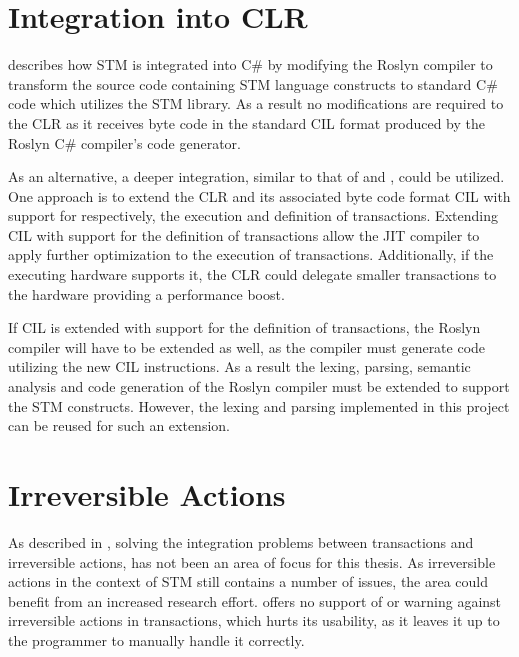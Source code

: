 \section{Integration into \acs{CLR}}\label{sec:fut_inte_clr}
 describes how \ac{STM} is integrated into C\# by modifying the Roslyn compiler to transform the source code containing \ac{STM} language constructs to standard C\# code which utilizes the \ac{STM} library. As a result no modifications are required to the \ac{CLR} as it receives byte code in the standard \ac{CIL} format produced by the Roslyn C\# compiler's code generator.

As an alternative, a deeper integration, similar to that of \cite{harris2003language} and \cite{duffy2010stmnet}, could be utilized. One approach is to extend the \ac{CLR} and its associated byte code format \ac{CIL} with support for respectively, the execution and definition of transactions. Extending \ac{CIL} with support for the definition of transactions allow the \ac{JIT} compiler to apply further optimization to the execution of transactions. Additionally, if the executing hardware supports it, the \ac{CLR} could delegate smaller transactions to the hardware providing a performance boost.

If \ac{CIL} is extended with support for the definition of transactions, the Roslyn compiler will have to be extended as well, as the compiler must generate code utilizing the new \ac{CIL} instructions. As a result the lexing, parsing, semantic analysis and code generation of the Roslyn compiler must be extended to support the \ac{STM} constructs. However, the lexing and parsing implemented in this project can be reused for such an extension.
%
\section{Irreversible Actions}\label{sec:fut_irreversible_actions}
As described in , solving the integration problems between transactions and irreversible actions, has not been an area of focus for this thesis. As irreversible actions in the context of \ac{STM} still contains a number of issues, the area could benefit from an increased research effort. \stmname offers no support of or warning against irreversible actions in transactions, which hurts its usability, as it leaves it up to the programmer to manually handle it correctly.

